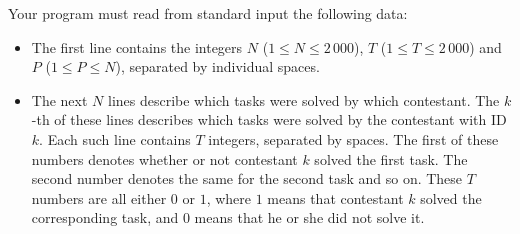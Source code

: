Your program must read from standard input the following data:
\begin{itemize}
\item The first line contains the integers $N$ ($1 \le N \le 2\,000$), $T$ ($1 \le T \le 2\,000$) and $P$ ($1 \le P \le N$), separated by individual spaces.
\item The next $N$ lines describe which tasks were solved by which contestant. The $k$-th of these lines describes which tasks were solved by the contestant with ID $k$. Each such line contains $T$ integers, separated by spaces. The first of these numbers denotes whether or not contestant $k$ solved the first task. The second number denotes the same for the second task and so on. These $T$ numbers are all either $0$ or $1$, where $1$ means that contestant $k$ solved the corresponding task, and $0$ means that he or she did not solve it. 
\end{itemize}
